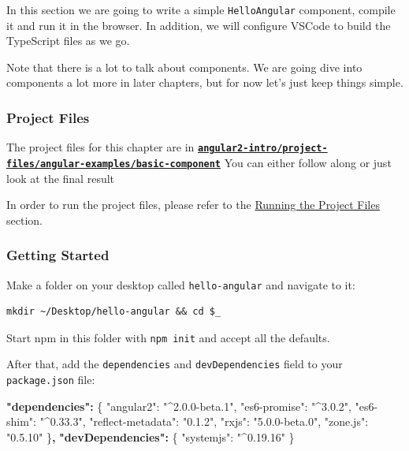 \documentclass[12pt,]{article}
\newenvironment{Shaded}{}{}
\newcommand{\DataTypeTok}[1]{{#1}}
\newcommand{\StringTok}[1]{\textcolor[rgb]{0.00,0.50,0.50}{{#1}}}
\newcommand{\FunctionTok}[1]{{#1}}
\newcommand{\ErrorTok}[1]{\textcolor[rgb]{1.00,0.00,0.00}{\textbf{{#1}}}}
\begin{document}
In this section we are going to write a simple \texttt{HelloAngular}
component, compile it and run it in the browser. In addition, we will
configure VSCode to build the TypeScript files as we go.

Note that there is a lot to talk about components. We are going dive
into components a lot more in later chapters, but for now let's just
keep things simple.

\subsubsection{Project Files}\label{project-files-1}

The project files for this chapter are in
\textbf{\href{https://github.com/st32lth/angular2-intro/tree/master/project-files/angular-examples/basic-component}{\texttt{angular2-intro/project-files/angular-examples/basic-component}}}
You can either follow along or just look at the final result

In order to run the project files, please refer to the
\protect\hyperlink{running-the-project-files}{Running the Project Files}
section.

\subsubsection{Getting Started}\label{getting-started}

Make a folder on your desktop called \texttt{hello-angular} and navigate
to it:

\begin{verbatim}
mkdir ~/Desktop/hello-angular && cd $_
\end{verbatim}

Start npm in this folder with \texttt{npm\ init} and accept all the
defaults.

After that, add the \texttt{dependencies} and \texttt{devDependencies}
field to your \texttt{package.json} file:

\begin{Shaded}
\begin{Highlighting}[numbers=left,,]
\ErrorTok{"dependencies":} \FunctionTok{\{}
  \DataTypeTok{"angular2"}\FunctionTok{:} \StringTok{"^2.0.0-beta.1"}\FunctionTok{,}
  \DataTypeTok{"es6-promise"}\FunctionTok{:} \StringTok{"^3.0.2"}\FunctionTok{,}
  \DataTypeTok{"es6-shim"}\FunctionTok{:} \StringTok{"^0.33.3"}\FunctionTok{,}
  \DataTypeTok{"reflect-metadata"}\FunctionTok{:} \StringTok{"0.1.2"}\FunctionTok{,}
  \DataTypeTok{"rxjs"}\FunctionTok{:} \StringTok{"5.0.0-beta.0"}\FunctionTok{,}
  \DataTypeTok{"zone.js"}\FunctionTok{:} \StringTok{"0.5.10"}
\FunctionTok{\}}\ErrorTok{,}
\ErrorTok{"devDependencies":} \FunctionTok{\{}
  \DataTypeTok{"systemjs"}\FunctionTok{:} \StringTok{"^0.19.16"}
\FunctionTok{\}}
\end{Highlighting}
\end{Shaded}
\end{document}
